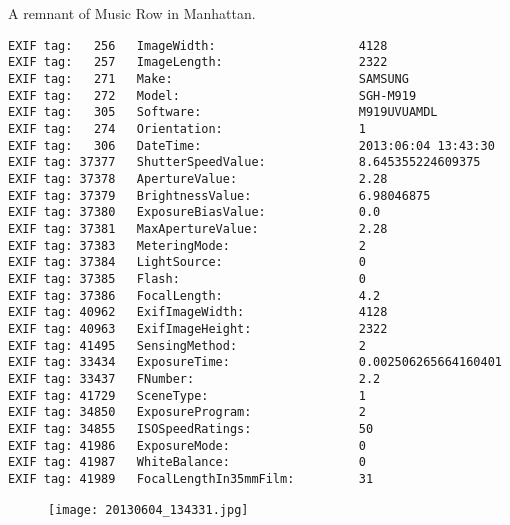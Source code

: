 \section{\protect{}}
\noindent A remnant of Music Row in Manhattan.
\noindent
\begin{lstlisting}
EXIF tag:   256   ImageWidth:                    4128
EXIF tag:   257   ImageLength:                   2322
EXIF tag:   271   Make:                          SAMSUNG
EXIF tag:   272   Model:                         SGH-M919
EXIF tag:   305   Software:                      M919UVUAMDL
EXIF tag:   274   Orientation:                   1
EXIF tag:   306   DateTime:                      2013:06:04 13:43:30
EXIF tag: 37377   ShutterSpeedValue:             8.645355224609375
EXIF tag: 37378   ApertureValue:                 2.28
EXIF tag: 37379   BrightnessValue:               6.98046875
EXIF tag: 37380   ExposureBiasValue:             0.0
EXIF tag: 37381   MaxApertureValue:              2.28
EXIF tag: 37383   MeteringMode:                  2
EXIF tag: 37384   LightSource:                   0
EXIF tag: 37385   Flash:                         0
EXIF tag: 37386   FocalLength:                   4.2
EXIF tag: 40962   ExifImageWidth:                4128
EXIF tag: 40963   ExifImageHeight:               2322
EXIF tag: 41495   SensingMethod:                 2
EXIF tag: 33434   ExposureTime:                  0.002506265664160401
EXIF tag: 33437   FNumber:                       2.2
EXIF tag: 41729   SceneType:                     1
EXIF tag: 34850   ExposureProgram:               2
EXIF tag: 34855   ISOSpeedRatings:               50
EXIF tag: 41986   ExposureMode:                  0
EXIF tag: 41987   WhiteBalance:                  0
EXIF tag: 41989   FocalLengthIn35mmFilm:         31

\end{lstlisting}
\clearpage
\begin{figure}
\raggedleft
\texttt{[image: 20130604\_134331.jpg]}
\end{figure}


\clearpage
